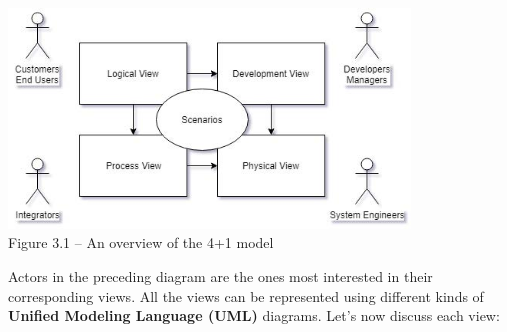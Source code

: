 \begin{center}
\includegraphics[width=0.8\textwidth]{content/1/chapter3/images/1.jpg}\\
Figure 3.1 – An overview of the 4+1 model
\end{center}

Actors in the preceding diagram are the ones most interested in their corresponding views. All the views can be represented using different kinds of \textbf{Unified Modeling Language (UML)} diagrams. Let's now discuss each view:

